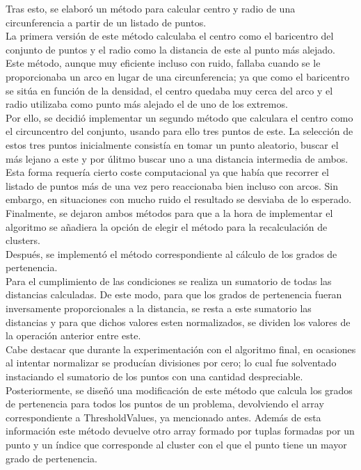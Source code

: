 \documentclass[conference,a4paper]{IEEEtran}
\begin{document}
Tras esto, se elaboró un método para calcular centro y radio de una circunferencia a partir de un listado de puntos.\\ 
La primera versión de este método calculaba el centro como el baricentro del conjunto de puntos y el radio como la distancia de este al punto más alejado. Este método, aunque muy eficiente incluso con ruido, fallaba cuando se le proporcionaba un arco en lugar de una circunferencia; ya que como el baricentro se sitúa en función de la densidad, el centro quedaba muy cerca del arco y el radio utilizaba como punto más alejado el de uno de los extremos.\\
Por ello, se decidió implementar un segundo método que calculara el centro como el circuncentro del conjunto, usando para ello tres puntos de este. La selección de estos tres puntos inicialmente consistía en tomar un punto aleatorio, buscar el más lejano a este y por úlitmo buscar uno a una distancia intermedia de ambos. Esta forma requería cierto coste computacional ya que había que recorrer el listado de puntos más de una vez pero reaccionaba bien incluso con arcos. Sin embargo, en situaciones con mucho ruido el resultado se desviaba de lo esperado. \\
Finalmente, se dejaron ambos métodos para que a la hora de implementar el algoritmo se añadiera la opción de elegir el método para la recalculación de clusters.\\

Después, se implementó el método correspondiente al cálculo de los grados de pertenencia.\\
Para el cumplimiento de las condiciones se realiza un sumatorio de todas las distancias calculadas. De este modo, para que los grados de pertenencia fueran inversamente proporcionales a la distancia, se resta a este sumatorio las distancias y para que dichos valores esten normalizados, se dividen los valores de la operación anterior entre este. \\
Cabe destacar que durante la experimentación con el algoritmo final, en ocasiones al intentar normalizar se producían divisiones por cero; lo cual fue solventado instaciando el sumatorio de los puntos con una cantidad despreciable.\\
Posteriormente, se diseñó una modificación de este método que calcula los grados de pertenencia para todos los puntos de un problema, devolviendo el array correspondiente a ThresholdValues, ya mencionado antes. Además de esta información este método devuelve otro array formado por tuplas formadas por un punto y un índice que corresponde al cluster con el que el punto tiene un mayor grado de pertenencia.\\
\end{document}
